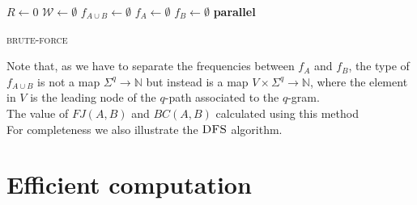    \begin{algorithm}[h]
    \small
    \DontPrintSemicolon
    \BlankLine
    $R \gets 0$\;
	$\mathcal{W} \gets \emptyset$\;
	$f_{A \cup B} \gets \emptyset$ \quad \;    
	$f_{A} \gets \emptyset$\; 
	$f_{B} \gets \emptyset$\; 
	\BlankLine
    \textbf{parallel} 
	\BlankLine    
	\BlankLine
    \caption{\textsc{brute-force}}
    \label{alg:brute-force}
    \end{algorithm}

	Note that, as we have to separate the frequencies between $f_{A}$ and $f_{B}$, the type of $f_{A \cup B}$ is not a map $ \Sigma^{q} \rightarrow \mathbb{N}$
	but instead is a map $V \times \Sigma^{q} \rightarrow \mathbb{N}$, where the element in $V$ is the leading node of the $q$-path associated to the $q$-gram.\\ 
	
	The value of $FJ(A,B)$ and $BC(A,B)$ calculated using this method\\
	
	For completeness we also illustrate the $\textsc{DFS}$ algorithm.
	

\section{Efficient computation}


